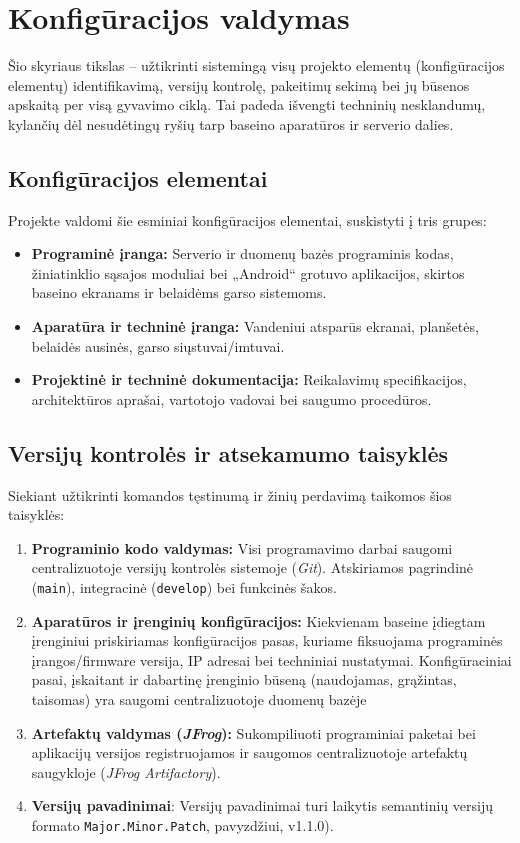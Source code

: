 \section{Konfigūracijos valdymas}
Šio skyriaus tikslas – užtikrinti sistemingą visų projekto elementų (konfigūracijos elementų) identifikavimą, versijų kontrolę, pakeitimų sekimą bei jų būsenos apskaitą per visą gyvavimo ciklą. Tai padeda išvengti techninių nesklandumų, kylančių dėl nesudėtingų ryšių tarp baseino aparatūros ir serverio dalies.

\subsection{Konfigūracijos elementai}
Projekte valdomi šie esminiai konfigūracijos elementai, suskistyti į tris grupes:
\begin{itemize}
    \item \textbf{Programinė įranga:} Serverio ir duomenų bazės programinis kodas, žiniatinklio sąsajos moduliai bei „Android“ grotuvo aplikacijos, skirtos baseino ekranams ir belaidėms garso sistemoms.
    \item \textbf{Aparatūra ir techninė įranga:} Vandeniui atsparūs ekranai, planšetės, belaidės ausinės, garso siųstuvai/imtuvai.
    \item \textbf{Projektinė ir techninė dokumentacija:} Reikalavimų specifikacijos, architektūros aprašai, vartotojo vadovai bei saugumo procedūros.
\end{itemize}

\subsection{Versijų kontrolės ir atsekamumo taisyklės}
Siekiant užtikrinti komandos tęstinumą ir žinių perdavimą taikomos šios taisyklės:
\begin{enumerate}
    \item \textbf{Programinio kodo valdymas:} Visi programavimo darbai saugomi centralizuotoje versijų kontrolės sistemoje (\emph{Git}). Atskiriamos pagrindinė (\texttt{main}), integracinė (\texttt{develop}) bei funkcinės šakos.
    \item \textbf{Aparatūros ir įrenginių konfigūracijos:} Kiekvienam baseine įdiegtam įrenginiui priskiriamas konfigūracijos pasas, kuriame fiksuojama programinės įrangos/firmware versija, IP adresai bei techniniai nustatymai. Konfigūraciniai pasai, įskaitant ir dabartinę įrenginio būseną (naudojamas, grąžintas, taisomas) yra saugomi centralizuotoje duomenų bazėje
    
    \item \textbf{Artefaktų valdymas (\emph{JFrog}):} Sukompiliuoti programiniai paketai bei aplikacijų versijos registruojamos ir saugomos centralizuotoje artefaktų saugykloje (\emph{JFrog Artifactory}).
    \item \textbf{Versijų pavadinimai}: Versijų pavadinimai turi laikytis semantinių versijų formato \texttt{Major.Minor.Patch}, pavyzdžiui, v1.1.0).
    
\end{enumerate}

